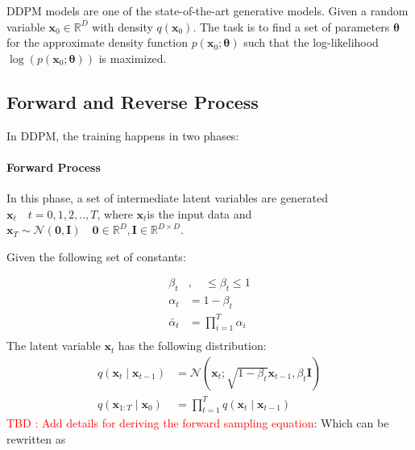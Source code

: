 \documentclass[11pt]{article}
\begin{document}
    DDPM models are one of the state-of-the-art generative models\cite{ho2020denoising}.
    Given a random variable $\mathbf{x}_0 \in \mathbb{R}^{D} $ with density $q(\mathbf{x}_0)$. The task is to
    find a set of parameters $\bm{\theta}$ for the approximate density function $p(\mathbf{x}_0;\bm{\theta})$
    such that the log-likelihood $ \log(p(\mathbf{x}_0;\bm{\theta}))$ is maximized.

    \subsection{Forward and Reverse Process}\label{subsec:forward-and-reverse-process}
    In DDPM, the training happens in two phases:

    \paragraph{Forward Process}
    In this phase, a set of intermediate latent variables are generated $\mathbf{x}_t \quad t={0,1,2,..,T}$, where
    $\mathbf{x}_t$is the input data and $\mathbf{x}_T \sim \mathcal{N}(\mathbf{0},\mathbf{I})
    \quad \mathbf{0} \in \mathbb{R}^{D}, \mathbf{I} \in \mathbb{R}^{D \times D}$.\par
    Given the following set of constants:

    \begin{equation}
        \begin{aligned}
            \beta_t &, \quad \leq \beta_t \leq 1 \\
            \alpha_t &= 1-\beta_t \\
            \bar{\alpha}_t &= \prod_{i=1}^{T} \alpha_i \\
        \end{aligned}
        \label{eq:ddpm-constants}
    \end{equation}
    The latent variable $\mathbf{x}_t$ has the following distribution:
    \begin{equation}
        \label{eq:ddpm-xt-given-xt-minus-1}
        \begin{aligned}
            q\left(\mathbf{x}_t \mid \mathbf{x}_{t-1}\right) &=\mathcal{N}\left(\mathbf{x}_t ;
            \sqrt{1-\beta_t} \mathbf{x}_{t-1}, \beta_t \mathbf{I}\right) \\
            q\left(\mathbf{x}_{1: T} \mid \mathbf{x}_0\right) &=\prod_{t=1}^T q\left(\mathbf{x}_t \mid \mathbf{x}_{t-1}\right)
        \end{aligned}
    \end{equation}
    \textcolor{red}{TBD : Add details for deriving the forward sampling equation}:
    Which can be rewritten as
\end{document}
